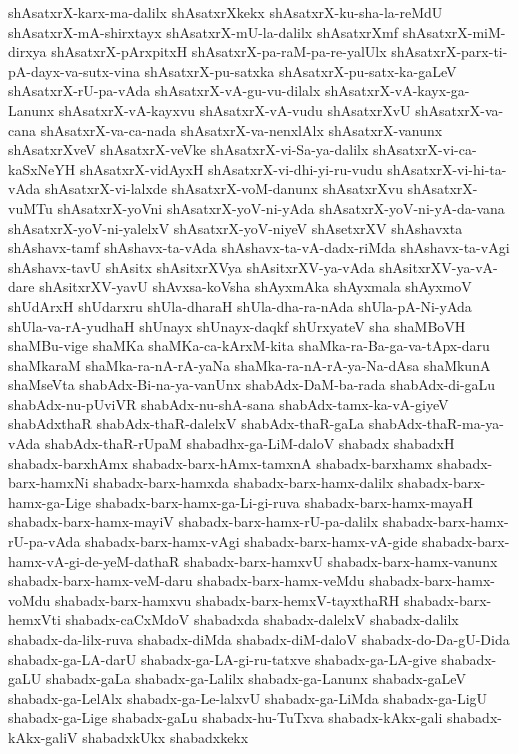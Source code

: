 {shAsatxrX-karx-ma-dalilx
shAsatxrXkekx
shAsatxrX-ku-sha-la-reMdU
shAsatxrX-mA-shirxtayx
shAsatxrX-mU-la-dalilx
shAsatxrXmf
shAsatxrX-miM-dirxya
shAsatxrX-pArxpitxH
shAsatxrX-pa-raM-pa-re-yalUlx
shAsatxrX-parx-ti-pA-dayx-va-sutx-vina
shAsatxrX-pu-satxka
shAsatxrX-pu-satx-ka-gaLeV
shAsatxrX-rU-pa-vAda
shAsatxrX-vA-gu-vu-dilalx
shAsatxrX-vA-kayx-ga-Lanunx
shAsatxrX-vA-kayxvu
shAsatxrX-vA-vudu
shAsatxrXvU
shAsatxrX-va-cana
shAsatxrX-va-ca-nada
shAsatxrX-va-nenxlAlx
shAsatxrX-vanunx
shAsatxrXveV
shAsatxrX-veVke
shAsatxrX-vi-Sa-ya-dalilx
shAsatxrX-vi-ca-kaSxNeYH
shAsatxrX-vidAyxH
shAsatxrX-vi-dhi-yi-ru-vudu
shAsatxrX-vi-hi-ta-vAda
shAsatxrX-vi-lalxde
shAsatxrX-voM-danunx
shAsatxrXvu
shAsatxrX-vuMTu
shAsatxrX-yoVni
shAsatxrX-yoV-ni-yAda
shAsatxrX-yoV-ni-yA-da-vana
shAsatxrX-yoV-ni-yalelxV
shAsatxrX-yoV-niyeV
shAsetxrXV
shAshavxta
shAshavx-tamf
shAshavx-ta-vAda
shAshavx-ta-vA-dadx-riMda
shAshavx-ta-vAgi
shAshavx-tavU
shAsitx
shAsitxrXVya
shAsitxrXV-ya-vAda
shAsitxrXV-ya-vA-dare
shAsitxrXV-yavU
shAvxsa-koVsha
shAyxmAka
shAyxmala
shAyxmoV
shUdArxH
shUdarxru
shUla-dharaH
shUla-dha-ra-nAda
shUla-pA-Ni-yAda
shUla-va-rA-yudhaH
shUnayx
shUnayx-daqkf
shUrxyateV
sha
shaMBoVH
shaMBu-vige
shaMKa
shaMKa-ca-kArxM-kita
shaMka-ra-Ba-ga-va-tApx-daru
shaMkaraM
shaMka-ra-nA-rA-yaNa
shaMka-ra-nA-rA-ya-Na-dAsa
shaMkunA
shaMseVta
shabAdx-Bi-na-ya-vanUnx
shabAdx-DaM-ba-rada
shabAdx-di-gaLu
shabAdx-nu-pUviVR
shabAdx-nu-shA-sana
shabAdx-tamx-ka-vA-giyeV
shabAdxthaR
shabAdx-thaR-dalelxV
shabAdx-thaR-gaLa
shabAdx-thaR-ma-ya-vAda
shabAdx-thaR-rUpaM
shabadhx-ga-LiM-daloV
shabadx
shabadxH
shabadx-barxhAmx
shabadx-barx-hAmx-tamxnA
shabadx-barxhamx
shabadx-barx-hamxNi
shabadx-barx-hamxda
shabadx-barx-hamx-dalilx
shabadx-barx-hamx-ga-Lige
shabadx-barx-hamx-ga-Li-gi-ruva
shabadx-barx-hamx-mayaH
shabadx-barx-hamx-mayiV
shabadx-barx-hamx-rU-pa-dalilx
shabadx-barx-hamx-rU-pa-vAda
shabadx-barx-hamx-vAgi
shabadx-barx-hamx-vA-gide
shabadx-barx-hamx-vA-gi-de-yeM-dathaR
shabadx-barx-hamxvU
shabadx-barx-hamx-vanunx
shabadx-barx-hamx-veM-daru
shabadx-barx-hamx-veMdu
shabadx-barx-hamx-voMdu
shabadx-barx-hamxvu
shabadx-barx-hemxV-tayxthaRH
shabadx-barx-hemxVti
shabadx-caCxMdoV
shabadxda
shabadx-dalelxV
shabadx-dalilx
shabadx-da-lilx-ruva
shabadx-diMda
shabadx-diM-daloV
shabadx-do-Da-gU-Dida
shabadx-ga-LA-darU
shabadx-ga-LA-gi-ru-tatxve
shabadx-ga-LA-give
shabadx-gaLU
shabadx-gaLa
shabadx-ga-Lalilx
shabadx-ga-Lanunx
shabadx-gaLeV
shabadx-ga-LelAlx
shabadx-ga-Le-lalxvU
shabadx-ga-LiMda
shabadx-ga-LigU
shabadx-ga-Lige
shabadx-gaLu
shabadx-hu-TuTxva
shabadx-kAkx-gali
shabadx-kAkx-galiV
shabadxkUkx
shabadxkekx
}
